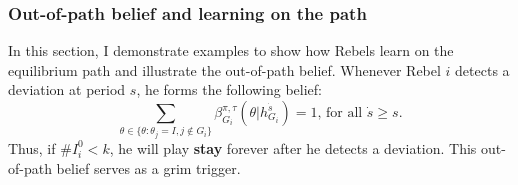 \documentclass[12pt,letter]{article}
\newcommand{\Kappa}{\mathrm{K}}
\theoremstyle{definition}
\theoremstyle{remark}
\theoremstyle{claim}
\begin{document}
\clearpage






\subsubsection{Out-of-path belief and learning on the path}
In this section, I demonstrate examples to show how Rebels learn on the equilibrium path and illustrate the out-of-path belief. Whenever Rebel $i$ detects a deviation at period $s$, he forms the following belief: 
\begin{equation}
\label{eq_grim_trigger}
\sum_{\theta \in \{\theta:\theta_j=I,j\notin G_i\}}\beta^{\pi,\tau}_{G_i}({\theta}|h^{\dot{s}}_{G_i})=1 \text{, for all $\dot{s}\geq s$}.
\end{equation}
Thus, if $\# I^0_i<k$, he will play \textbf{stay} forever after he detects a deviation. This out-of-path belief serves as a grim trigger. 
\end{document}
